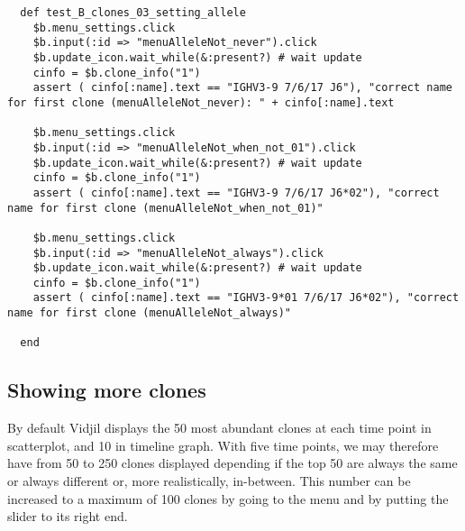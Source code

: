 \begin{verbatim}
  def test_B_clones_03_setting_allele
    $b.menu_settings.click
    $b.input(:id => "menuAlleleNot_never").click
    $b.update_icon.wait_while(&:present?) # wait update
    cinfo = $b.clone_info("1")
    assert ( cinfo[:name].text == "IGHV3-9 7/6/17 J6"), "correct name for first clone (menuAlleleNot_never): " + cinfo[:name].text

    $b.menu_settings.click
    $b.input(:id => "menuAlleleNot_when_not_01").click
    $b.update_icon.wait_while(&:present?) # wait update
    cinfo = $b.clone_info("1")
    assert ( cinfo[:name].text == "IGHV3-9 7/6/17 J6*02"), "correct name for first clone (menuAlleleNot_when_not_01)"

    $b.menu_settings.click
    $b.input(:id => "menuAlleleNot_always").click
    $b.update_icon.wait_while(&:present?) # wait update
    cinfo = $b.clone_info("1")
    assert ( cinfo[:name].text == "IGHV3-9*01 7/6/17 J6*02"), "correct name for first clone (menuAlleleNot_always)"

  end
\end{verbatim}

\subsection{Showing more clones}

By default Vidjil displays the 50 most abundant clones at each time point in scatterplot, and 10 in timeline graph.
With five time points, we may therefore have from 50 to 250 clones displayed
depending if the top 50 are always the same or always different or, more
realistically, in-between.
This number can be increased to a maximum of 100 clones by going to the  menu and by putting the
slider to its right end.

